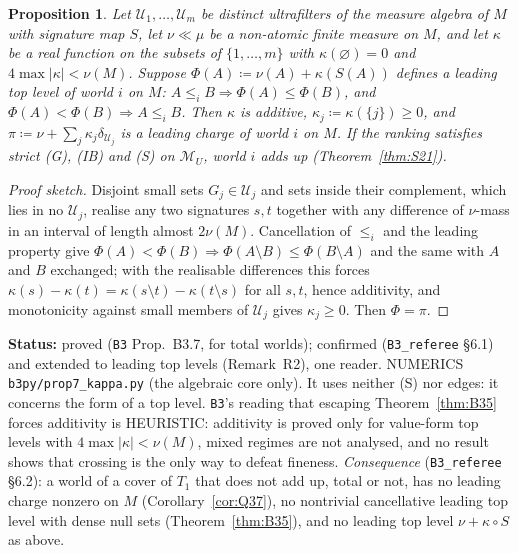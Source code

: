 \documentclass[11pt]{article}
\newtheorem{proposition}[theorem]{Proposition}
\theoremstyle{definition}
\theoremstyle{remark}
\newcommand{\M}{\mathcal M}
\newcommand{\src}[1]{\texttt{#1}}
\newcommand{\status}[1]{\par\smallskip\noindent\textbf{Status:} #1\par\smallskip}
\begin{document}
\begin{proposition}\label{prop:B37}
Let $\mathcal U_1,\dots,\mathcal U_m$ be distinct ultrafilters of the measure algebra of $M$ with signature map $S$, let $\nu\ll\mu$ be a non-atomic finite measure on $M$, and let $\kappa$ be a real function on the subsets of $\{1,\dots,m\}$ with $\kappa(\varnothing)=0$ and $4\max|\kappa|<\nu(M)$. Suppose $\Phi(A)\coloneqq\nu(A)+\kappa(S(A))$ defines a leading top level of world $i$ on $M$: $A\le_iB\Rightarrow\Phi(A)\le\Phi(B)$, and $\Phi(A)<\Phi(B)\Rightarrow A\le_iB$. Then $\kappa$ is additive, $\kappa_j\coloneqq\kappa(\{j\})\ge0$, and $\pi\coloneqq\nu+\sum_j\kappa_j\delta_{\mathcal U_j}$ is a leading charge of world $i$ on $M$. If the ranking satisfies strict (G), (IB) and (S) on $\M_U$, world $i$ adds up (Theorem~\ref{thm:S21}).
\end{proposition}
\begin{proof}[Proof sketch]
Disjoint small sets $G_j\in\mathcal U_j$ and sets inside their complement, which lies in no $\mathcal U_j$, realise any two signatures $s,t$ together with any difference of $\nu$-mass in an interval of length almost $2\nu(M)$. Cancellation of $\le_i$ and the leading property give $\Phi(A)<\Phi(B)\Rightarrow\Phi(A\setminus B)\le\Phi(B\setminus A)$ and the same with $A$ and $B$ exchanged; with the realisable differences this forces $\kappa(s)-\kappa(t)=\kappa(s\setminus t)-\kappa(t\setminus s)$ for all $s,t$, hence additivity, and monotonicity against small members of $\mathcal U_j$ gives $\kappa_j\ge0$. Then $\Phi=\pi$.
\end{proof}
\status{proved (\src{B3} Prop.~B3.7, for total worlds); confirmed (\src{B3\_referee} \S6.1) and extended to leading top levels (Remark~R2), one reader. NUMERICS \src{b3py/prop7\_kappa.py} (the algebraic core only). It uses neither (S) nor edges: it concerns the form of a top level. \src{B3}'s reading that escaping Theorem~\ref{thm:B35} forces additivity is HEURISTIC: additivity is proved only for value-form top levels with $4\max|\kappa|<\nu(M)$, mixed regimes are not analysed, and no result shows that crossing is the only way to defeat fineness. \emph{Consequence} (\src{B3\_referee} \S6.2): a world of a cover of $T_1$ that does not add up, total or not, has no leading charge nonzero on $M$ (Corollary~\ref{cor:Q37}), no nontrivial cancellative leading top level with dense null sets (Theorem~\ref{thm:B35}), and no leading top level $\nu+\kappa\circ S$ as above.}
\end{document}
